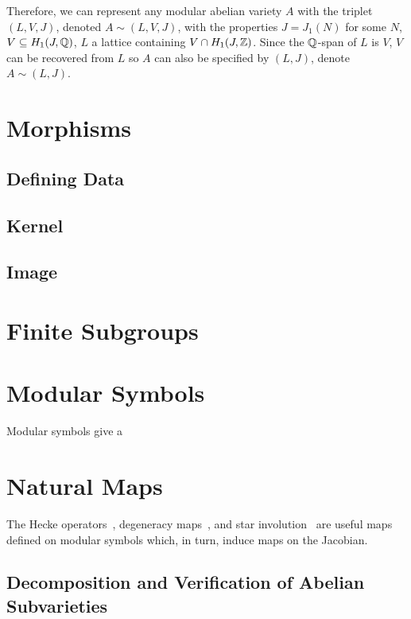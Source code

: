 Therefore, we can represent any modular abelian variety $A$ with the triplet
$(L, V, J)$, denoted $A\sim (L, V, J)$, with the properties $J=J_1(N)$
for some $N$, $V\subseteq H_1(J, \mathbb{Q})$, $L$ a lattice containing $V\cap H_1(J,
\mathbb{Z})$. Since the $\mathbb{Q}$-span of $L$ is $V$, $V$ can be recovered from $L$ so $A$
can also be specified by $(L, J)$, denote $A\sim (L, J)$.

\section{Morphisms}%
\label{sec:morphisms}

\subsection{Defining Data}%
\label{sub:defining_data}

\subsection{Kernel}%
\label{sub:kernel}

\subsection{Image}%
\label{sub:image}

\section{Finite Subgroups}%
\label{sec:finite_subgroups}

\section{Modular Symbols}
\label{sec:modular_symbols}

Modular symbols give a 

\section{Natural Maps}%
\label{sec:alg_natural_maps}
The Hecke operators~\cite[\S 8.3]{stein:modform}, degeneracy maps~\cite[\S
8.6]{stein:modform}, and star involution~\cite[\S 8.5]{stein:modform} are
useful maps defined on modular symbols which, in turn, induce maps on the
Jacobian.

\subsection{Decomposition and Verification of Abelian Subvarieties}
\label{sec:decomp_verify}

